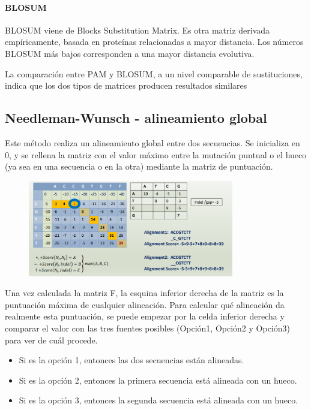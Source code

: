 \paragraph{BLOSUM}
BLOSUM viene de Blocks Substitution Matrix. Es otra matriz derivada empíricamente, basada en proteínas relacionadas a mayor distancia. Los números BLOSUM más bajos corresponden a una mayor distancia evolutiva.

La comparación entre PAM y BLOSUM, a un nivel comparable de sustituciones, indica que los dos tipos de matrices producen resultados similares

\subsection{Needleman-Wunsch - alineamiento global}
Este método realiza un alineamiento global entre dos secuencias. Se inicializa en 0, y se rellena la matriz con el valor máximo entre la mutación puntual o el hueco (ya sea en una secuencia o en la otra) mediante la matriz de puntuación. 

\begin{figure}[h]
\centering
\includegraphics[width = 0.8\textwidth]{figs/needleman-wunsch.png}
\end{figure}

Una vez calculada la matriz F, la esquina inferior derecha de la matriz es la puntuación máxima de cualquier alineación. Para calcular qué alineación da realmente esta puntuación, se puede empezar por la celda inferior derecha y comparar el valor con las tres fuentes posibles (Opción1, Opción2 y Opción3) para ver de cuál procede.
\begin{itemize}
\item Si es la opción 1, entonces las dos secuencias están alineadas.
\item Si es la opción 2, entonces la primera secuencia está alineada con un hueco.
\item Si es la opción 3, entonces la segunda secuencia está alineada con un hueco.
\end{itemize}

